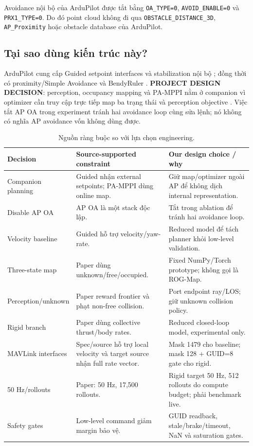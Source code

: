\documentclass[11pt,a4paper]{article}
\newcommand{\code}[1]{\texttt{#1}}
\begin{document}
Avoidance nội bộ của ArduPilot được tắt bằng \code{OA\_TYPE=0},
\code{AVOID\_ENABLE=0} và \code{PRX1\_TYPE=0}. Do đó point cloud không đi qua
\code{OBSTACLE\_DISTANCE\_3D}, \code{AP\_Proximity} hoặc obstacle database của
ArduPilot.

\subsection{Tại sao dùng kiến trúc này?}

ArduPilot cung cấp Guided setpoint interfaces và stabilization nội bộ
\cite{ardupilotGuidedDocs2026}; đồng thời có proximity/Simple Avoidance và
BendyRuler \cite{ardupilotSimpleAvoidance2026,ardupilotBendyRuler2026}.
\textbf{PROJECT DESIGN DECISION}: perception, occupancy mapping và PA-MPPI nằm
ở companion vì optimizer cần truy cập trực tiếp map ba trạng thái và perception
objective \cite{zhai2026pamppi}. Việc tắt AP OA trong experiment tránh hai
avoidance loop cùng sửa lệnh; nó không có nghĩa AP avoidance vốn không dùng được.

\begin{table}[ht]
\centering\small
\caption{Nguồn ràng buộc so với lựa chọn engineering.}
\begin{tabularx}{\textwidth}{L{0.21\textwidth}L{0.30\textwidth}Y}
\toprule
\textbf{Decision} & \textbf{Source-supported constraint} & \textbf{Our design choice / why}\\
\midrule
Companion planning & Guided nhận external setpoints; PA-MPPI dùng online map. & Giữ map/optimizer ngoài AP để không dịch internal representation.\\
Disable AP OA & AP OA là một stack độc lập. & Tắt trong ablation để tránh hai avoidance loop.\\
Velocity baseline & Guided hỗ trợ velocity/yaw-rate. & Reduced model để tách planner khỏi low-level validation.\\
Three-state map & Paper dùng unknown/free/occupied. & Fixed NumPy/Torch prototype; không gọi là ROG-Map.\\
Perception/unknown & Paper reward frontier và phạt non-free collision. & Port endpoint ray/LOS; giữ unknown collision policy.\\
Rigid branch & Paper dùng collective thrust/body rates. & Reduced closed-loop model, experimental only.\\
MAVLink interfaces & Spec/source hỗ trợ local velocity và target source nhận full rate vector. & Mask 1479 cho baseline; mask 128 + GUID=8 gate cho rigid.\\
50 Hz/rollouts & Paper: 50 Hz, 17,500 rollouts. & Rigid target 50 Hz, 512 rollouts do compute budget; phải benchmark live.\\
Safety gates & Low-level command giảm margin bảo vệ. & GUID readback, stale/brake/timeout, NaN và saturation gates.\\
\bottomrule
\end{tabularx}
\end{table}
\end{document}
